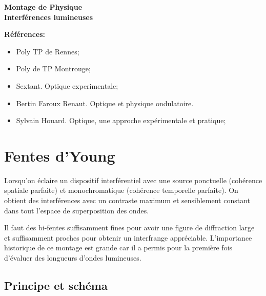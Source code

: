 \documentclass[french]{article}
\begin{document}


\begin{center}
	\begin{mdframed}[style=titr, leftmargin=55pt, rightmargin=55pt, innertopmargin=8pt, innerbottommargin=8pt, innerrightmargin=10pt, innerleftmargin=10pt]
		
		
		\begin{center}
			\large{\textbf{Montage de Physique}} \\
			\Large{\textbf{Interférences lumineuses}}
		\end{center}
		
	\end{mdframed}
\end{center}

\noindent\textbf{\large Références:}\gap

\begin{itemize}
	\item Poly TP de Rennes;
	\item Poly de TP Montrouge;
	\item Sextant. Optique experimentale;
	\item Bertin Faroux Renaut. Optique et physique ondulatoire.
	\item Sylvain Houard. Optique, une approche expérimentale et pratique;
\end{itemize}

\section{Fentes d'Young}

Lorsqu'on éclaire un dispositif interférentiel  avec une source ponctuelle (cohérence spatiale parfaite) et monochromatique (cohérence temporelle parfaite). On obtient des interférences avec un contraste maximum et sensiblement constant dans tout l'espace de superposition des ondes.\vspace{.15cm}

Il faut des bi-fentes suffisamment fines pour avoir une figure de diffraction large et suffisamment proches pour obtenir un interfrange appréciable. L'importance historique de ce montage est grande car il a permis pour la première fois d'évaluer des longueurs d'ondes lumineuses. 


\subsection{Principe et schéma}
\end{document}
